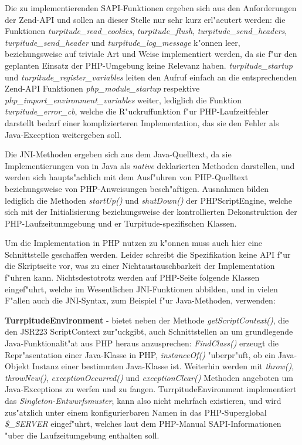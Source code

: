 Die zu implementierenden SAPI-Funktionen ergeben sich aus den Anforderungen der Zend-API und sollen an dieser Stelle nur
sehr kurz erl"aeutert werden: die Funktionen \emph{turpitude\_read\_cookies}, \emph{turpitude\_flush}, \emph{turpitude\_send\_headers},
\emph{turpitude\_send\_header} und \emph{turpitude\_log\_message} k"onnen leer, beziehungsweise auf triviale Art und Weise
implementiert werden, da sie f"ur den geplanten Einsatz der PHP-Umgebung keine Relevanz haben.
\emph{turpitude\_startup} und \emph{turpitude\_register\_variables} leiten den Aufruf einfach an die entsprechenden
Zend-API Funktionen \emph{php\_module\_startup} respektive \emph{php\_import\_environment\_variables} weiter, lediglich
die Funktion \emph{turpitude\_error\_cb}, welche die R"uckruffunktion f"ur PHP-Laufzeitfehler darstellt bedarf einer
komplizierteren Implementation, das sie den Fehler als Java-Exception weitergeben soll.

Die JNI-Methoden ergeben sich aus dem Java-Quelltext, da sie Implementierungen von in Java als \emph{native} deklarierten 
Methoden darstellen, und werden sich haupts"achlich mit dem Ausf"uhren von PHP-Quelltext beziehungsweise von PHP-Anweisungen
besch"aftigen. Ausnahmen bilden lediglich die Methoden \emph{startUp()} und \emph{shutDown()} der PHPScriptEngine, welche
sich mit der Initialisierung beziehungsweise der kontrollierten Dekonstruktion der PHP-Laufzeitunmgebung und er Turpitude-spezifischen
Klassen.

Um die Implementation in PHP nutzen zu k"onnen muss auch hier eine Schnittstelle geschaffen werden. Leider schreibt
die Spezifikation keine API f"ur die Skriptseite vor, was zu einer Nichtaustauschbarkeit der Implementation f"uhren kann.
Nichtsdestotrotz werden auf PHP-Seite folgende Klassen eingef"uhrt, welche im Wesentlichen JNI-Funktionen abbilden, und
in vielen F"allen auch die JNI-Syntax, zum Beispiel f"ur Java-Methoden, verwenden:

\textbf{TurrpitudeEnvironment} - bietet neben der Methode \emph{getScriptContext()}, die den JSR223 ScriptContext zur"uckgibt,
auch Schnittstellen an um grundlegende Java-Funktionalit"at aus PHP heraus anzusprechen:
\emph{FindClass()} erzeugt die Repr"asentation einer Java-Klasse in PHP, \emph{instanceOf()} "uberpr"uft, ob ein Java-Objekt 
Instanz einer bestimmten Java-Klasse ist. Weiterhin werden mit \emph{throw()}, \emph{throwNew()}, \emph{exceptionOccurred()} und 
\emph{exceptionClear()} Methoden angeboten um Java-Exceptions zu werfen und zu fangen. TurrpitudeEnvironment implementiert
das \emph{Singleton-Entwurfsmuster}, kann also nicht mehrfach existieren, und wird zus"atzlich unter einem konfigurierbaren
Namen in das PHP-Superglobal \emph{\$\_SERVER} eingef"uhrt, welches laut dem PHP-Manual \cite{PHPMAN} SAPI-Informationen "uber die
Laufzeitumgebung enthalten soll.

